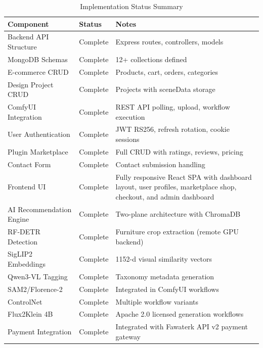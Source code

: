 \begin{table}[htbp]
    \centering
    \caption{Implementation Status Summary}
    \label{tab:impl_status}
    \begin{tabularx}{\textwidth}{|p{4cm}|p{2cm}|X|}
        \hline
        \textbf{Component} & \textbf{Status} & \textbf{Notes} \\
        \hline
        Backend API Structure & Complete & Express routes, controllers, models \\
        \hline
        MongoDB Schemas & Complete & 12+ collections defined \\
        \hline
        E-commerce CRUD & Complete & Products, cart, orders, categories \\
        \hline
        Design Project CRUD & Complete & Projects with sceneData storage \\
        \hline
        ComfyUI Integration & Complete & REST API polling, upload, workflow execution \\
        \hline
        User Authentication & Complete & JWT RS256, refresh rotation, cookie sessions \\
        \hline
        Plugin Marketplace & Complete & Full CRUD with ratings, reviews, pricing \\
        \hline
        Contact Form & Complete & Contact submission handling \\
        \hline
        Frontend UI & Complete & Fully responsive React SPA with dashboard layout, user profiles, marketplace shop, checkout, and admin dashboard \\
        \hline
        AI Recommendation Engine & Complete & Two-plane architecture with ChromaDB \\
        \hline
        RF-DETR Detection & Complete & Furniture crop extraction (remote GPU backend) \\
        \hline
        SigLIP2 Embeddings & Complete & 1152-d visual similarity vectors \\
        \hline
        Qwen3-VL Tagging & Complete & Taxonomy metadata generation \\
        \hline
        SAM2/Florence-2 & Complete & Integrated in ComfyUI workflows \\
        \hline
        ControlNet & Complete & Multiple workflow variants \\
        \hline
        Flux2Klein 4B & Complete & Apache 2.0 licensed generation workflows \\
        \hline

        Payment Integration & Complete & Integrated with Fawaterk API v2 payment gateway \\
        \hline
    \end{tabularx}
\end{table}
